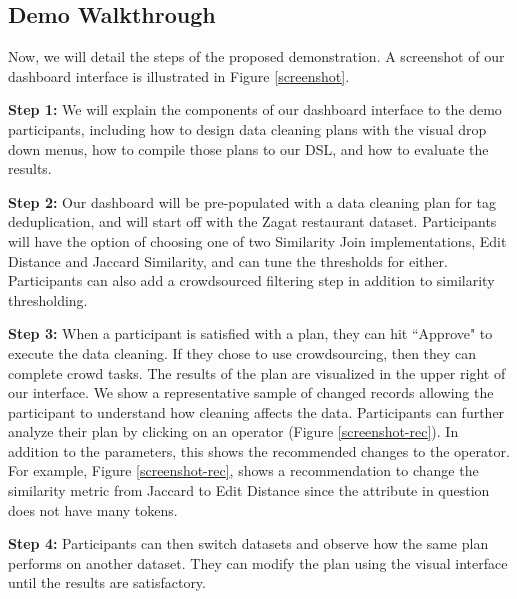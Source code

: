\subsection{Demo Walkthrough}
Now, we will detail the steps of the proposed demonstration.
A screenshot of our dashboard interface is illustrated in Figure \ref{screenshot}.

\vspace{0.2em}

\noindent\textbf{Step 1: } We will explain the components of our dashboard interface to the
demo participants, including how to design data cleaning plans with the visual 
drop down menus, how to compile those plans to our DSL, and how to evaluate the results.

\vspace{0.2em}

\noindent\textbf{Step 2: } Our dashboard will be pre-populated with a data cleaning plan for tag deduplication, and will
start off with the Zagat restaurant dataset. Participants will have the option of choosing one of two Similarity Join implementations, Edit Distance and Jaccard Similarity, and can tune the thresholds for either.
Participants can also add a crowdsourced filtering step in addition to similarity thresholding. 

\vspace{0.2em}

\noindent\textbf{Step 3: } When a participant is satisfied with a plan, they can hit ``Approve" to execute the data cleaning. 
If they chose to use crowdsourcing, then they can complete crowd tasks. 
The results of the plan are visualized in the upper right of our interface.
We show a representative sample of changed records allowing the participant to understand how cleaning affects the data. 
Participants can further analyze their plan by clicking on an operator (Figure \ref{screenshot-rec}).
In addition to the parameters, this shows the recommended changes to the operator.
For example, Figure \ref{screenshot-rec}, shows a recommendation to change the similarity metric from Jaccard to Edit Distance since the attribute in question does not have many tokens.

\vspace{0.2em}

\noindent\textbf{Step 4: } Participants can then switch datasets and observe how the same plan performs on another dataset.
They can modify the plan using the visual interface until the results are satisfactory.
